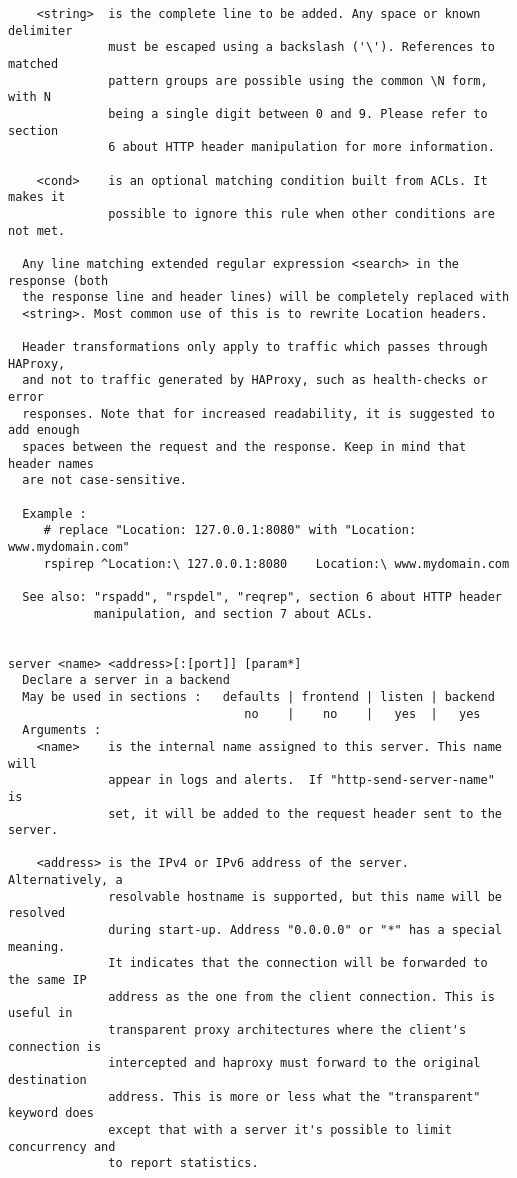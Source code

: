 \begin{verbatim}
    <string>  is the complete line to be added. Any space or known delimiter
              must be escaped using a backslash ('\'). References to matched
              pattern groups are possible using the common \N form, with N
              being a single digit between 0 and 9. Please refer to section
              6 about HTTP header manipulation for more information.

    <cond>    is an optional matching condition built from ACLs. It makes it
              possible to ignore this rule when other conditions are not met.

  Any line matching extended regular expression <search> in the response (both
  the response line and header lines) will be completely replaced with
  <string>. Most common use of this is to rewrite Location headers.

  Header transformations only apply to traffic which passes through HAProxy,
  and not to traffic generated by HAProxy, such as health-checks or error
  responses. Note that for increased readability, it is suggested to add enough
  spaces between the request and the response. Keep in mind that header names
  are not case-sensitive.

  Example :
     # replace "Location: 127.0.0.1:8080" with "Location: www.mydomain.com"
     rspirep ^Location:\ 127.0.0.1:8080    Location:\ www.mydomain.com

  See also: "rspadd", "rspdel", "reqrep", section 6 about HTTP header
            manipulation, and section 7 about ACLs.


server <name> <address>[:[port]] [param*]
  Declare a server in a backend
  May be used in sections :   defaults | frontend | listen | backend
                                 no    |    no    |   yes  |   yes
  Arguments :
    <name>    is the internal name assigned to this server. This name will
              appear in logs and alerts.  If "http-send-server-name" is
              set, it will be added to the request header sent to the server.

    <address> is the IPv4 or IPv6 address of the server. Alternatively, a
              resolvable hostname is supported, but this name will be resolved
              during start-up. Address "0.0.0.0" or "*" has a special meaning.
              It indicates that the connection will be forwarded to the same IP
              address as the one from the client connection. This is useful in
              transparent proxy architectures where the client's connection is
              intercepted and haproxy must forward to the original destination
              address. This is more or less what the "transparent" keyword does
              except that with a server it's possible to limit concurrency and
              to report statistics.


\end{verbatim}
